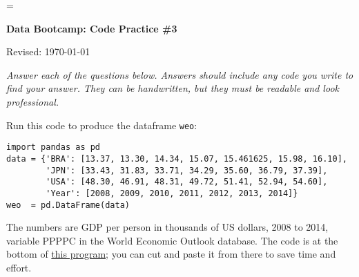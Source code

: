 \documentclass[11pt]{exam}
\begin{document}
\parskip=\bigskipamount
\parindent=0.0in
\thispagestyle{empty}


\bigskip\bigskip
\centerline{\Large \bf Data Bootcamp:  Code Practice \#3}
\centerline{Revised: \today}

{\it Answer each of the questions below.
Answers should include any code you write to find your answer.
They can be handwritten, but they must be readable and look professional.}


Run this code to produce the dataframe \texttt{weo}:
\vspace{-0.15in}
\begin{verbatim}
import pandas as pd
data = {'BRA': [13.37, 13.30, 14.34, 15.07, 15.461625, 15.98, 16.10],
        'JPN': [33.43, 31.83, 33.71, 34.29, 35.60, 36.79, 37.39],
        'USA': [48.30, 46.91, 48.31, 49.72, 51.41, 52.94, 54.60],
        'Year': [2008, 2009, 2010, 2011, 2012, 2013, 2014]}
weo  = pd.DataFrame(data)
\end{verbatim}
\vspace{-0.15in}
The numbers are GDP per person in thousands of US dollars, 2008 to 2014,
variable PPPPC in the World Economic Outlook database.
The code is at the bottom of
\href{https://github.com/DaveBackus/Data_Bootcamp/blob/master/Code/Python/bootcamp_pandas_1.py}
{this program};
you can cut and paste it from there to save time and effort.
\end{document}
